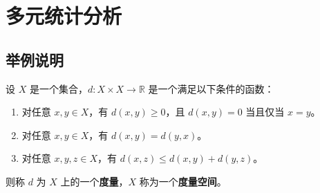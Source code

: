 \documentclass[12pt, a4paper, oneside, UTF8]{ctexbook}
\begin{document}
	\else
	\fi
	\chapter{多元统计分析}
	
	\section{举例说明}
	
	\begin{defn}
		设 $X$ 是一个集合，$d: X \times X \to \mathbb{R}$ 是一个满足以下条件的函数：
		\begin{enumerate}
			\item 对任意 $x, y \in X$，有 $d(x, y) \geq 0$，且 $d(x, y) = 0$ 当且仅当 $x = y$。
			\item 对任意 $x, y \in X$，有 $d(x, y) = d(y, x)$。
			\item 对任意 $x, y, z \in X$，有 $d(x, z) \leq d(x, y) + d(y, z)$。
		\end{enumerate}
		则称 $d$ 为 $X$ 上的一个\textbf{度量}，$X$ 称为一个\textbf{度量空间}。
	\end{defn}
	
	\ifx\allfiles\undefined
\end{document}
